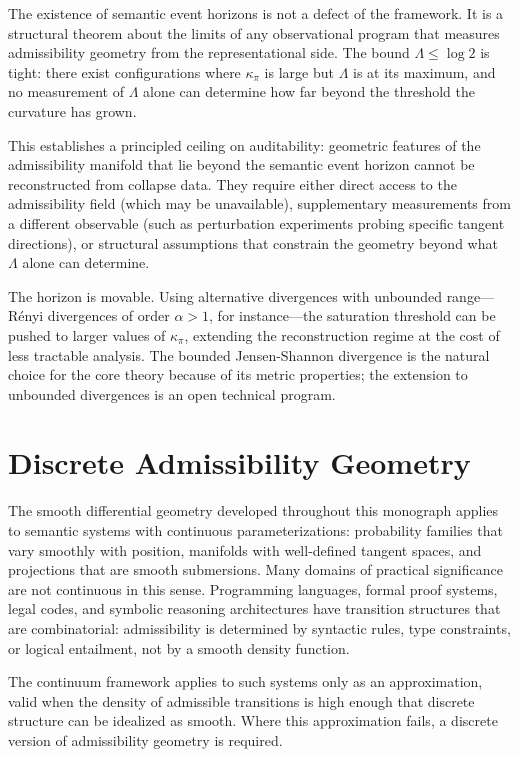 \documentclass[12pt, oneside]{book}
\theoremstyle{plain-flyxion}
\theoremstyle{definition-flyxion}
\newcommand{\kpi}{\kappa_{\pi}}
\newcommand{\Lam}{\Lambda}
\begin{document}
The existence of semantic event horizons is not a defect of the framework. It is a
structural theorem about the limits of any observational program that measures
admissibility geometry from the representational side. The bound $\Lam \leq \log 2$ is
tight: there exist configurations where $\kpi$ is large but $\Lam$ is at its maximum,
and no measurement of $\Lam$ alone can determine how far beyond the threshold the
curvature has grown.

This establishes a principled ceiling on auditability: geometric features of the
admissibility manifold that lie beyond the semantic event horizon cannot be reconstructed
from collapse data. They require either direct access to the admissibility field (which
may be unavailable), supplementary measurements from a different observable (such as
perturbation experiments probing specific tangent directions), or structural assumptions
that constrain the geometry beyond what $\Lam$ alone can determine.

The horizon is movable. Using alternative divergences with unbounded range---Rényi
divergences of order $\alpha > 1$, for instance---the saturation threshold can be pushed
to larger values of $\kpi$, extending the reconstruction regime at the cost of less
tractable analysis. The bounded Jensen-Shannon divergence is the natural choice for the
core theory because of its metric properties; the extension to unbounded divergences is
an open technical program.

\section{Discrete Admissibility Geometry}

The smooth differential geometry developed throughout this monograph applies to semantic
systems with continuous parameterizations: probability families that vary smoothly with
position, manifolds with well-defined tangent spaces, and projections that are smooth
submersions. Many domains of practical significance are not continuous in this sense.
Programming languages, formal proof systems, legal codes, and symbolic reasoning
architectures have transition structures that are combinatorial: admissibility is
determined by syntactic rules, type constraints, or logical entailment, not by a smooth
density function.

The continuum framework applies to such systems only as an approximation, valid when
the density of admissible transitions is high enough that discrete structure can be
idealized as smooth. Where this approximation fails, a discrete version of admissibility
geometry is required.
\end{document}
